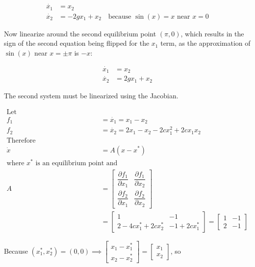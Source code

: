 \documentclass[11pt]{article}
\theoremstyle{definition}
\begin{document}
\begin{enumerate}
\begin{enumerate}
        \begin{align*}
            \dot{x_1} &= x_2 \\
            \dot{x_2} &= -2 g x_1 + x_2 \quad \text{because $\sin(x) = x$ near $x = 0$}
        \end{align*}

        Now linearize around the second equilibrium point $(\pi, 0)$, which results in the sign of the second equation being flipped for the $x_1$ term, as the approximation of $\sin(x)$ near $x = \pm \pi$ is $-x$:

        \begin{align*}
            \dot{x_1} &= x_2 \\
            \dot{x_2} &= 2 g x_1 + x_2
        \end{align*}

        The second system must be linearized using the Jacobian.

        \begin{align*}
            \text{Let} \\
            f_1 &= \dot{x_1} = x_1 - x_2 \\
            f_2 &= \dot{x_2} = 2x_1 - x_2 - 2c x_1^2 + 2c x_1 x_2 \\
            \text{Therefore} \\
            \dot{x} &= A(x - x^*)\\
            \text{where } x^* \text{ is an equilibrium point and} \\
            A &= \begin{bmatrix}
                \dfrac{\partial f_1}{\partial x_1} & \dfrac{\partial f_1}{\partial x_2} \\
                \dfrac{\partial f_2}{\partial x_1} & \dfrac{\partial f_2}{\partial x_2} 
            \end{bmatrix} \\
            &= \begin{bmatrix} 
                1 & -1 \\
                2 - 4c x_1^* + 2c x_2^* & -1 +2c x_1^*
            \end{bmatrix} = 
            \begin{bmatrix}
                1 & -1 \\
                2 & -1
            \end{bmatrix}
        \end{align*}

        Because $(x_1^*, x_2^*) = (0,0) \implies \begin{bmatrix} x_1 - x_1^* \\ x_2 - x_2^* \end{bmatrix} = \begin{bmatrix} x_1 \\ x_2 \end{bmatrix}$, so


\end{enumerate}
\end{enumerate}
\end{document}
